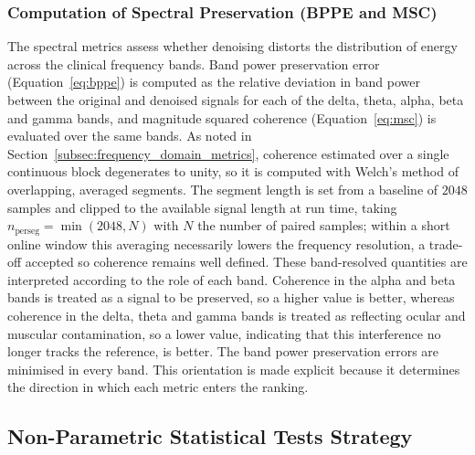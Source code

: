 \documentclass[MScCS,12pt,oneside,final]{uccthesis}
\begin{document}
\subsubsection{Computation of Spectral Preservation (BPPE and MSC)}
\label{subsubsec:computation_spectral}
 
The spectral metrics assess whether denoising distorts the distribution of energy across the clinical frequency bands. Band power preservation error (Equation~\ref{eq:bppe}) is computed as the relative deviation in band power between the original and denoised signals for each of the delta, theta, alpha, beta and gamma bands, and magnitude squared coherence (Equation~\ref{eq:msc}) is evaluated over the same bands. As noted in Section~\ref{subsec:frequency_domain_metrics}, coherence estimated over a single continuous block degenerates to unity, so it is computed with Welch's method of overlapping, averaged segments. The segment length is set from a baseline of $2048$ samples and clipped to the available signal length at run time, taking $n_{\mathrm{perseg}} = \min(2048, N)$ with $N$ the number of paired samples; within a short online window this averaging necessarily lowers the frequency resolution, a trade-off accepted so coherence remains well defined. These band-resolved quantities are interpreted according to the role of each band. Coherence in the alpha and beta bands is treated as a signal to be preserved, so a higher value is better, whereas coherence in the delta, theta and gamma bands is treated as reflecting ocular and muscular contamination, so a lower value, indicating that this interference no longer tracks the reference, is better. The band power preservation errors are minimised in every band. This orientation is made explicit because it determines the direction in which each metric enters the ranking.

\subsection{Non-Parametric Statistical Tests Strategy}
\label{subsec:non_parametric_tests}
\end{document}
